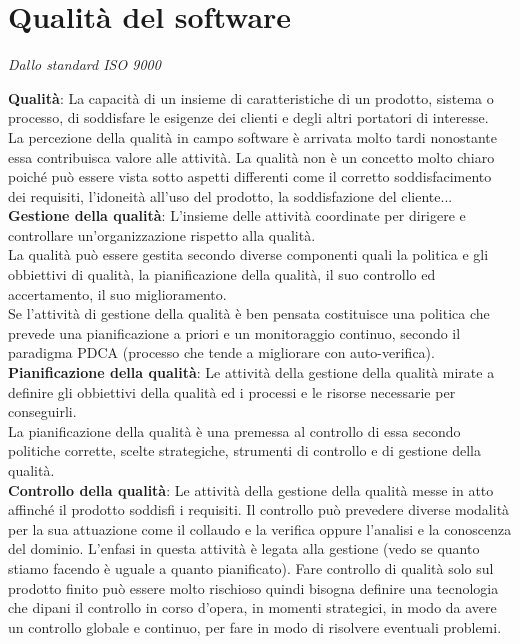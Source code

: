 \section{Qualità del software}
\begin{center}\textit{Dallo standard ISO 9000}\end{center}

\textbf{Qualità}: La capacità di un insieme di caratteristiche di un prodotto, sistema o processo, di soddisfare le esigenze dei clienti e degli altri portatori di interesse.\\
La percezione della qualità in campo software è arrivata molto tardi nonostante essa contribuisca valore alle attività. La qualità non è un concetto molto chiaro poiché può essere vista sotto aspetti differenti come il corretto soddisfacimento dei requisiti, l'idoneità all'uso del prodotto, la soddisfazione del cliente...\\
\textbf{Gestione della qualità}: L'insieme delle attività coordinate per dirigere e controllare un'organizzazione rispetto alla qualità.
\\
La qualità può essere gestita secondo diverse componenti quali la politica e gli obbiettivi di qualità, la pianificazione della qualità, il suo controllo ed accertamento, il suo miglioramento.\\
Se l'attività di gestione della qualità è ben pensata costituisce una politica che prevede una pianificazione a priori e un monitoraggio continuo, secondo il paradigma PDCA (processo che tende a migliorare con auto-verifica).\\

\textbf{Pianificazione della qualità}: Le attività della gestione della qualità mirate a definire gli obbiettivi della qualità ed i processi e le risorse necessarie per conseguirli.\\
La pianificazione della qualità è una premessa al controllo di essa secondo politiche corrette, scelte strategiche, strumenti di controllo e di gestione della qualità.\\

\textbf{Controllo della qualità}: Le attività della gestione della qualità messe in atto affinché il prodotto soddisfi i requisiti.
Il controllo può prevedere diverse modalità per la sua attuazione come il collaudo e la verifica oppure l'analisi e la conoscenza del dominio. L'enfasi in questa attività è legata alla gestione (vedo se quanto stiamo facendo è uguale a quanto pianificato). Fare controllo di qualità solo sul prodotto finito può essere molto rischioso quindi bisogna definire una tecnologia che dipani il controllo in corso d'opera, in momenti strategici, in modo da avere un controllo globale e continuo, per fare in modo di risolvere eventuali problemi.\\

